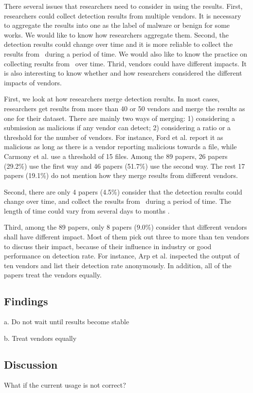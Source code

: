There several issues that researchers need to consider in using the results. 
First, researchers could collect detection results from multiple vendors. 
It is necessary to aggregate the results into one as the label of malware or benign for some works. 
We would like to know how researchers aggregate them. 
Second, the detection results could change over time and it is more reliable to collect the results from \vt\ during a period of time. 
We would also like to know the practice on collecting results from \vt\ over time. 
Thrid, vendors could have different impacts. 
It is also interesting to know whether and how researchers considered the different impacts of vendors.

First, we look at how researchers merge detection results. 
In most cases, researchers get results from more than 40 or 50 vendors and merge the results as one for their dataset. 
There are mainly two ways of merging: 1) considering a submission as malicious if any vendor can detect; 2) considering a ratio or a threshold for the number of vendors. 
For instance, Ford et al. \cite{ford2009analyzing} report it as malicious as long as there is a vendor reporting malicious
towards a file, while Carmony et al. use a threshold of 15 files. 
Among the 89 papers, 26 papers (29.2\%) use the first way and 46 papers  (51.7\%) use the second way. 
The rest 17 papers (19.1\%) do not mention how they merge results from different vendors.

Second, there are only 4 papers (4.5\%) consider that the detection results could change over time, and collect the results from \vt\ during a period of time. 
The length of time could vary from several days \cite{kharraz2016unveil, rajab2013camp} to months \cite{neeles, wressnegger2017looking}. 

Third, among the 89 papers, only 8 papers (9.0\%) consider that different vendors shall have different impact. 
Most of them pick out three to more than ten vendors to discuss their impact, because of their influence in industry or good performance on detection rate. 
For instance, Arp et al. \cite{arp2014drebin} inspected the output of ten vendors and list their detection rate anonymously. 
In addition, all of the papers treat the vendors equally. %
\subsection{Findings}
a. Do not wait until results become stable

b. Treat vendors equally

\subsection{Discussion}
What if the current usage is not correct? 
